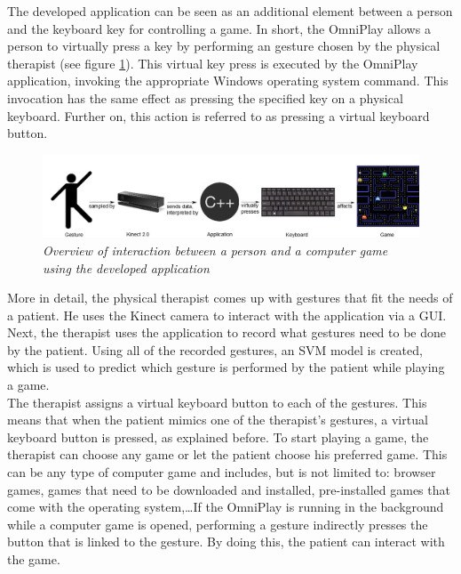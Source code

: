 The developed application can be seen as an additional element between a person and the keyboard key for controlling a game. In short, the OmniPlay allows a person to virtually press a key by performing an gesture chosen by the physical therapist (see figure \ref{fig: overview_application_interaction}). This virtual key press is executed by the OmniPlay application, invoking the appropriate Windows operating system command. This invocation has the same effect as pressing the specified key on a physical keyboard. Further on, this action is referred to as pressing a virtual keyboard button. \\

\begin{figure}[H]
\begin{center}
\includegraphics[width=14cm]{Concept2.png}
\caption{\emph{Overview of interaction between a person and a computer game using the developed application}}
\label{fig: overview_application_interaction}
\end{center}
\end{figure}

More in detail, the physical therapist comes up with gestures that fit the needs of a patient. He uses the Kinect camera to interact with the application via a GUI. Next, the therapist uses the application to record what gestures need to be done by the patient. Using all of the recorded gestures, an SVM model is created, which is used to predict which gesture is performed by the patient while playing a game.\\

The therapist assigns a virtual keyboard button to each of the gestures. This means that when the patient mimics one of the therapist's gestures, a virtual keyboard button is pressed, as explained before. To start playing a game, the therapist can choose any game or let the patient choose his preferred game. This can be any type of computer game and includes, but is not limited to: browser games, games that need to be downloaded and installed, pre-installed games that come with the operating system,\ldots If the OmniPlay is running in the background while a computer game is opened, performing a gesture indirectly presses the button that is linked to the gesture. By doing this, the patient can interact with the game.\\

